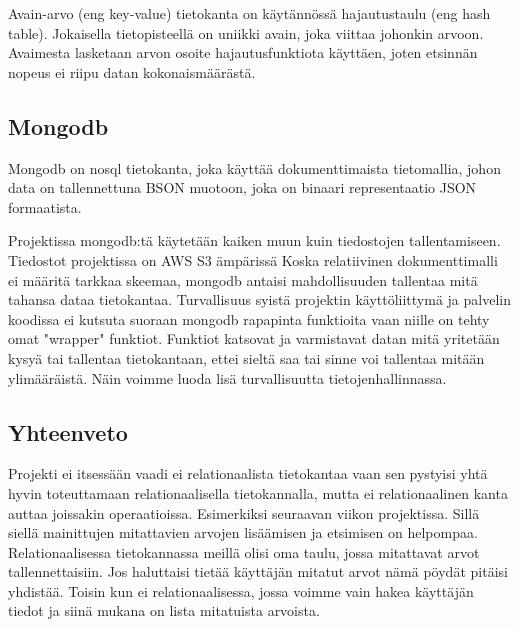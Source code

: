 Avain-arvo (eng key-value) tietokanta on käytännössä hajautustaulu (eng hash table).
Jokaisella tietopisteellä on uniikki avain, joka viittaa johonkin arvoon. 
Avaimesta lasketaan arvon osoite hajautusfunktiota käyttäen, joten etsinnän nopeus ei riipu datan kokonaismäärästä.
\medskip




\subsection*{Mongodb}

Mongodb on nosql tietokanta, joka käyttää dokumenttimaista tietomallia, johon data on tallennettuna BSON muotoon, joka on binaari representaatio JSON formaatista.
\medskip

Projektissa mongodb:tä käytetään kaiken muun kuin tiedostojen tallentamiseen. Tiedostot projektissa on AWS S3 ämpärissä
Koska relatiivinen dokumenttimalli ei määritä tarkkaa skeemaa, mongodb antaisi mahdollisuuden tallentaa mitä tahansa dataa tietokantaa.
Turvallisuus syistä projektin käyttöliittymä ja palvelin koodissa ei kutsuta suoraan mongodb rapapinta funktioita vaan niille on tehty omat "wrapper"{} funktiot.
Funktiot katsovat ja varmistavat datan mitä yritetään kysyä tai tallentaa tietokantaan, ettei sieltä saa tai sinne voi tallentaa mitään ylimääräistä.
Näin voimme luoda lisä turvallisuutta tietojenhallinnassa.
\medskip



\subsection*{Yhteenveto}


Projekti ei itsessään vaadi ei relationaalista tietokantaa vaan sen pystyisi yhtä hyvin toteuttamaan relationaalisella tietokannalla, 
mutta ei relationaalinen kanta auttaa joissakin operaatioissa.
Esimerkiksi seuraavan viikon projektissa. Sillä siellä mainittujen mitattavien arvojen lisäämisen ja etsimisen on helpompaa.
Relationaalisessa tietokannassa meillä olisi oma taulu, jossa mitattavat arvot tallennettaisiin.
Jos haluttaisi tietää käyttäjän mitatut arvot nämä pöydät pitäisi yhdistää.
Toisin kun ei relationaalisessa, jossa voimme vain hakea käyttäjän tiedot ja siinä mukana on lista mitatuista arvoista.



